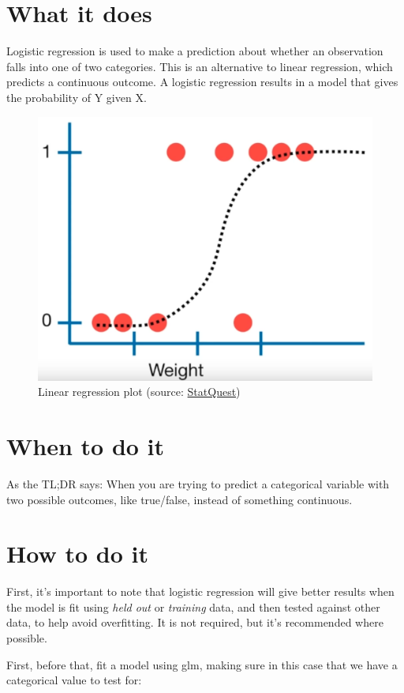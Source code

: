 \documentclass[
]{book}
\begin{document}
\hypertarget{what-it-does-2}{%
\section{What it does}\label{what-it-does-2}}

Logistic regression is used to make a prediction about whether an observation falls into one of two categories. This is an alternative to linear regression, which predicts a continuous outcome. A logistic regression results in a model that gives the probability of Y given X.



\begin{figure}
\includegraphics[width=0.5\linewidth]{images/4_1} \caption{Linear regression plot (source: \href{https://youtu.be/yIYKR4sgzI8?t=222}{StatQuest})}\label{fig:img-lr1}
\end{figure}

\hypertarget{when-to-do-it-2}{%
\section{When to do it}\label{when-to-do-it-2}}

As the TL;DR says: When you are trying to predict a categorical variable with two possible outcomes, like true/false, instead of something continuous.

\hypertarget{how-to-do-it-2}{%
\section{How to do it}\label{how-to-do-it-2}}

First, it's important to note that logistic regression will give better results when the model is fit using \emph{held out} or \emph{training} data, and then tested against other data, to help avoid overfitting. It is not required, but it's recommended where possible.

First, before that, fit a model using glm, making sure in this case that we have a categorical value to test for:
\end{document}
